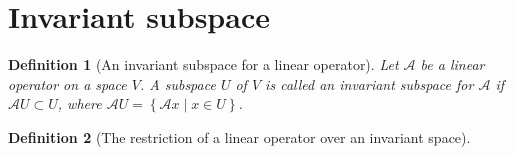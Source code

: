 \documentclass[onecolumn]{ctexart}
\newtheorem{definition}{Definition}
\begin{document}
\section{Invariant subspace}
\begin{definition}[An invariant subspace for a linear operator]
  Let $\mathcal{A}$ be a linear operator on a space $V$. A subspace $U$ of $V$ 
  is called an invariant subspace for $\mathcal{A}$ if $\mathcal{A}U \subset U$, 
  where $\mathcal{A}U = \left\{ \mathcal{A}x \mid x \in U \right\}$.
\end{definition}

\begin{definition}[The restriction of a linear operator over an invariant space]
  
\end{definition}
\end{document}
